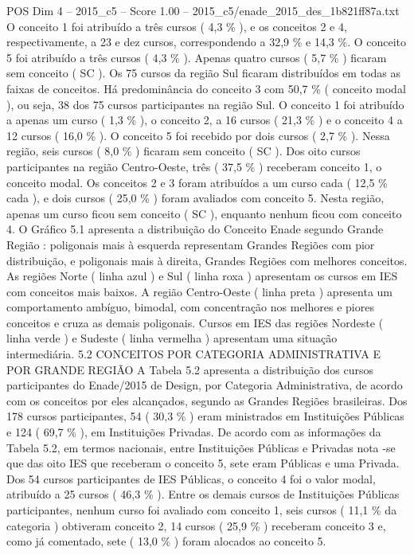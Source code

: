 \begin{textsample}{POS Dim 4 – 2015\_c5 – Score 1.00 – 2015\_c5/enade\_2015\_des\_1b821ff87a.txt}
O conceito 1 foi atribuído a três cursos ( 4,3 \% ), e os conceitos 2 e 4, respectivamente, a 23 e dez cursos, correspondendo a 32,9 \% e 14,3 \%.
O conceito 5 foi atribuído a três cursos ( 4,3 \% ).
Apenas quatro cursos ( 5,7 \% ) ficaram sem conceito ( SC ).
Os 75 cursos da região Sul ficaram distribuídos em todas as faixas de conceitos.
Há predominância do conceito 3 com 50,7 \% ( conceito modal ), ou seja, 38 dos 75 cursos participantes na região Sul.
O conceito 1 foi atribuído a apenas um curso ( 1,3 \% ), o conceito 2, a 16 cursos ( 21,3 \% ) e o conceito 4 a 12 cursos ( 16,0 \% ).
O conceito 5 foi recebido por dois cursos ( 2,7 \% ).
Nessa região, seis cursos ( 8,0 \% ) ficaram sem conceito ( SC ).
Dos oito cursos participantes na região Centro-Oeste, três ( 37,5 \% ) receberam conceito 1, o conceito modal.
Os conceitos 2 e 3 foram atribuídos a um curso cada ( 12,5 \% cada ), e dois cursos ( 25,0 \% ) foram avaliados com conceito 5.
Nesta região, apenas um curso ficou sem conceito ( SC ), enquanto nenhum ficou com conceito 4.
O Gráfico 5.1 apresenta a distribuição do Conceito Enade segundo Grande Região : poligonais mais à esquerda representam Grandes Regiões com pior distribuição, e poligonais mais à direita, Grandes Regiões com melhores conceitos.
As regiões Norte ( linha azul ) e Sul ( linha roxa ) apresentam os cursos em IES com conceitos mais baixos.
A região Centro-Oeste ( linha preta ) apresenta um comportamento ambíguo, bimodal, com concentração nos melhores e piores conceitos e cruza as demais poligonais.
Cursos em IES das regiões Nordeste ( linha verde ) e Sudeste ( linha vermelha ) apresentam uma situação intermediária. 5.2 CONCEITOS POR CATEGORIA ADMINISTRATIVA E POR GRANDE REGIÃO A Tabela 5.2 apresenta a distribuição dos cursos participantes do Enade/2015 de Design, por Categoria Administrativa, de acordo com os conceitos por eles alcançados, segundo as Grandes Regiões brasileiras.
Dos 178 cursos participantes, 54 ( 30,3 \% ) eram ministrados em Instituições Públicas e 124 ( 69,7 \% ), em Instituições Privadas.
De acordo com as informações da Tabela 5.2, em termos nacionais, entre Instituições Públicas e Privadas nota -se que das oito IES que receberam o conceito 5, sete eram Públicas e uma Privada.
Dos 54 cursos participantes de IES Públicas, o conceito 4 foi o valor modal, atribuído a 25 cursos ( 46,3 \% ).
Entre os demais cursos de Instituições Públicas participantes, nenhum curso foi avaliado com conceito 1, seis cursos ( 11,1 \% da categoria ) obtiveram conceito 2, 14 cursos ( 25,9 \% ) receberam conceito 3 e, como já comentado, sete ( 13,0 \% ) foram alocados ao conceito 5.

\end{textsample}
